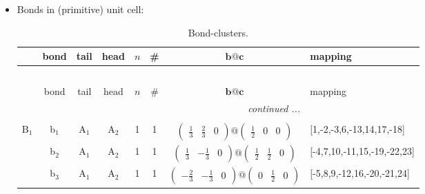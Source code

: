 \documentclass[fleqn,10pt,landscape]{article}
\begin{document}
\begin{itemize}
\item Bonds in (primitive) unit cell:
\begin{center}
\renewcommand{\arraystretch}{1.3}
\begin{longtable}{cc|cc|c|c|c|l}
\caption{Bond-clusters.}
 \\
 \hline \hline
 & bond & tail & head & $n$ & \# & $\bm{b}@\bm{c}$ & mapping \\ \hline \endfirsthead

\multicolumn{7}{l}{\tablename\ \thetable{}} \\
 \hline \hline
 & bond & tail & head & $n$ & \# & $\bm{b}@\bm{c}$ & mapping \\ \hline \endhead

 \hline \hline
\multicolumn{7}{r}{\footnotesize\it continued ...} \\ \endfoot

 \hline \hline
\multicolumn{7}{r}{} \\ \endlastfoot

B$_{1}$ & b$_{1}$ & A$_{1}$ & A$_{2}$ & 1 & 1 & $\begin{pmatrix} \frac{1}{3} & \frac{2}{3} & 0 \end{pmatrix}@\begin{pmatrix} \frac{1}{2} & 0 & 0 \end{pmatrix}$ & [1,-2,-3,6,-13,14,17,-18] \\
& b$_{2}$ & A$_{1}$ & A$_{2}$ & 1 & 1 & $\begin{pmatrix} \frac{1}{3} & - \frac{1}{3} & 0 \end{pmatrix}@\begin{pmatrix} \frac{1}{2} & \frac{1}{2} & 0 \end{pmatrix}$ & [-4,7,10,-11,15,-19,-22,23] \\
& b$_{3}$ & A$_{1}$ & A$_{2}$ & 1 & 1 & $\begin{pmatrix} - \frac{2}{3} & - \frac{1}{3} & 0 \end{pmatrix}@\begin{pmatrix} 0 & \frac{1}{2} & 0 \end{pmatrix}$ & [-5,8,9,-12,16,-20,-21,24] \\
\end{longtable}
\end{center}


\end{itemize}
\end{document}
